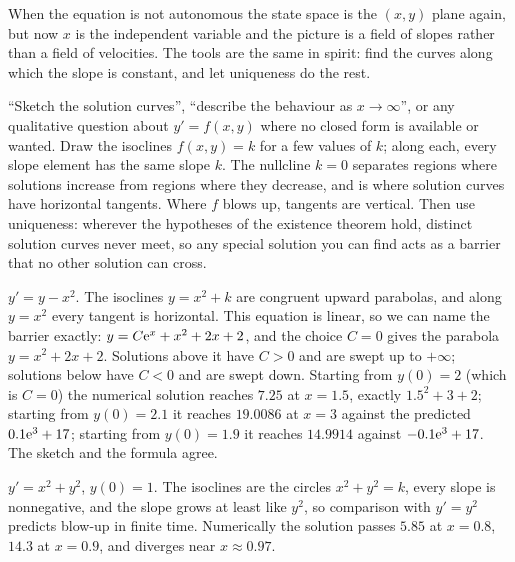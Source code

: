 When the equation is not autonomous the state space is the $(x,y)$ plane again, but now $x$ is the independent variable and the picture is a field of slopes rather than a field of velocities. The tools are the same in spirit: find the curves along which the slope is constant, and let uniqueness do the rest.

\cue ``Sketch the solution curves'', ``describe the behaviour as $x\to\infty$'', or any qualitative question about $y'=f(x,y)$ where no closed form is available or wanted.
\method Draw the isoclines $f(x,y)=k$ for a few values of $k$; along each, every slope element has the same slope $k$. The nullcline $k=0$ separates regions where solutions increase from regions where they decrease, and is where solution curves have horizontal tangents. Where $f$ blows up, tangents are vertical. Then use uniqueness: wherever the hypotheses of the existence theorem hold, distinct solution curves never meet, so any special solution you can find acts as a barrier that no other solution can cross.

\begin{worked}
$y'=y-x^{2}$. The isoclines $y=x^{2}+k$ are congruent upward parabolas, and along $y=x^{2}$ every tangent is horizontal. This equation is linear, so we can name the barrier exactly: $y=C\mathrm{e}^{x}+x^{2}+2x+2$, and the choice $C=0$ gives the parabola $y=x^{2}+2x+2$. Solutions above it have $C>0$ and are swept up to $+\infty$; solutions below have $C<0$ and are swept down. Starting from $y(0)=2$ (which is $C=0$) the numerical solution reaches $7.25$ at $x=1.5$, exactly $1.5^{2}+3+2$; starting from $y(0)=2.1$ it reaches $19.0086$ at $x=3$ against the predicted $0.1\mathrm{e}^{3}+17$; starting from $y(0)=1.9$ it reaches $14.9914$ against $-0.1\mathrm{e}^{3}+17$. The sketch and the formula agree.

$y'=x^{2}+y^{2}$, $y(0)=1$. The isoclines are the circles $x^{2}+y^{2}=k$, every slope is nonnegative, and the slope grows at least like $y^{2}$, so comparison with $y'=y^{2}$ predicts blow-up in finite time. Numerically the solution passes $5.85$ at $x=0.8$, $14.3$ at $x=0.9$, and diverges near $x\approx0.97$.
\end{worked}

